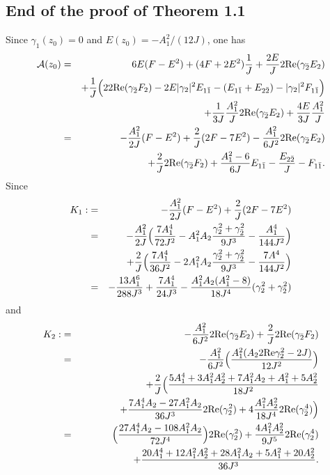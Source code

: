 \documentclass[12pt]{amsart}
\def\cal{\mathcal}
\begin{document}
\subsection{End of the proof of Theorem 1.1}

Since $\gamma_1(z_0)=0$ and $E(z_0)=-A_1^2/(12J)$, one has
\begin{eqnarray*}
{\cal A}(z_0)
&=&6 E(F-E^2) +(4F+2E^2) {1 \over J} +{2E \over J} 2\hbox{Re} (\gamma_{\bar2} E_2) \\
&&+ {1\over J} \Big( 2 2\hbox{Re} (\gamma_{\bar2} F_2)   -2E |\gamma_2|^2 E_{1\bar1} -(E_{1\bar1}+E_{2\bar2})
-|\gamma_2|^2 F_{1\bar1}\Big)\\
&&+{1\over 3J} {A_1^2 \over J} 2\hbox{Re} (\gamma_{\bar2} E_2)+{4E \over 3 J}  {A_1^2 \over J} \\
&=&-{A_1^2 \over 2J} (F-E^2) +{2\over J} (2F-7E^2)  -{A_1^2 \over 6J^2 } 2\hbox{Re} (\gamma_{\bar2} E_2) \\
&&+ {2 \over J} 2\hbox{Re} (\gamma_{\bar2} F_2)   +{A_1^2-6 \over 6 J} E_{1\bar1} -{E_{2\bar2} \over J} 
-F_{1\bar1}.\\
\end{eqnarray*}
Since
\begin{eqnarray*}
K_1:&=&-{A_1^2 \over 2J} (F-E^2)+{2\over J}(2F-7E^2)\\
&=&-{A_1^2 \over 2J}\Big( {7 A_1^4 \over 72 J^2}  -A_1^2A_2 {\gamma_2^2+\gamma_{\bar2}^2\over 9 J^3} -{A_1^4\over 144J^2}\Big)\\
&&+{2\over J} \Big( {7 A_1^4 \over 36 J^2} -2A_1^2A_2 {\gamma_2^2+\gamma_{\bar2}^2\over 9 J^3} -{7A^4\over 144 J^2}\Big)\\
&=&-{13 A_1^6\over 288 J^3}+{7 A_1^4\over 24J^3}-{A_1^2A_2(A_1^2-8)\over 18 J^4} (\gamma_2^2+\gamma_{\bar2}^2)
\end{eqnarray*}
and
\begin{eqnarray*}
K_2:&=&-{A_1^2\over 6J^2} 2\hbox{Re}(\gamma_{\bar2} E_2)+{2\over J} 2\hbox{Re}(\gamma_{\bar2} F_2)\\
&=&-{A_1^2\over 6J^2} \Big({A_1^2 (A_2 2\hbox{Re} \gamma_2^2-2J) \over 12J^2}  \Big)\\
&&+ {2\over J}\Big({5A_1^4+3A_1^2A_2^2+7A_1^2A_2+A_1^2 +5A_2^2 \over 18 J^2} \nonumber\\
&&\qquad \qquad +{7A_1^4A_2-27A_1^2A_2\over 36 J^3} 2\hbox{Re}(\gamma_2^2)+4{A_1^2A_2^2 \over 18J^4} 2\hbox{Re}(\gamma_{\bar2}^4)\Big)\\
 &=&\Big({27A_1^4A_2 -108A_1^2 A_2\over 72 J^4}\Big) 2\hbox{Re}(\gamma_2^2)
 +{4 A_1^2 A_2^2 \over 9J^5} 2\hbox{Re}(\gamma_2^4)\\
 &&+{20A_1^4 +12 A_1^2A_2^2+28A_1^2A_2+ 5A_1^2+20A_2^2 \over 36 J^3}.
\end{eqnarray*}
\end{document}
